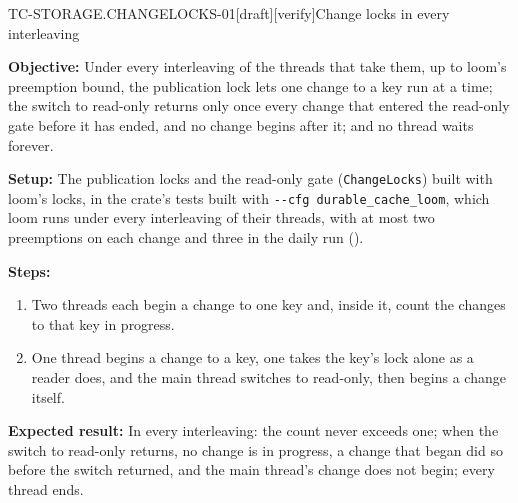 \begin{requirement}{TC-STORAGE.CHANGELOCKS-01}[draft][verify]{Change locks in every interleaving}


  \textbf{Objective:} Under every interleaving of the threads that take
  them, up to loom's preemption bound, the publication lock lets one change
  to a key run at a time; the switch to read-only returns only once every
  change that entered the read-only gate before it has ended, and no change
  begins after it; and no thread waits forever.

  \textbf{Setup:} The publication locks and the read-only gate
  (\texttt{ChangeLocks}) built with loom's locks, in the crate's tests built
  with \texttt{-{}-cfg durable\_cache\_loom}, which loom runs under every
  interleaving of their threads, with at most two preemptions on each change
  and three in the daily run ().

  \textbf{Steps:}
  \begin{enumerate}
    \item Two threads each begin a change to one key and, inside it, count
      the changes to that key in progress.
    \item One thread begins a change to a key, one takes the key's lock alone
      as a reader does, and the main thread switches to read-only, then
      begins a change itself.
  \end{enumerate}

  \textbf{Expected result:} In every interleaving: the count never exceeds
  one; when the switch to read-only returns, no change is in progress, a
  change that began did so before the switch returned, and the main thread's
  change does not begin; every thread ends.



\end{requirement}

